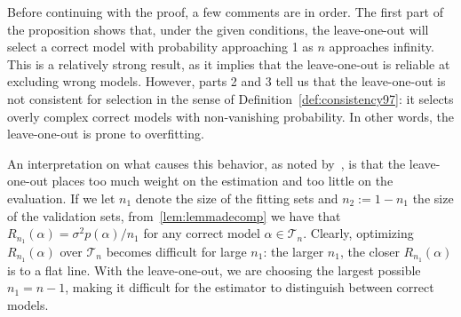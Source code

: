 \documentclass[11pt, letter paper]{article}
\newcommand{\1}{\mathmybb{1}}
\newcommand{\0}{\emptyset}
\newcommand{\Tcal}{\mathcal{T}_{n}}
\begin{document}
Before continuing with the proof, a few comments are in order. The first part of the proposition shows that, under the given conditions, the leave-one-out will select a correct model with probability approaching 1 as \(n\) approaches infinity. This is a relatively strong result, as it implies that the leave-one-out is reliable at excluding wrong models. However, parts 2 and 3 tell us that the leave-one-out is not consistent for selection in the sense of Definition~\ref{def:consistency97}: it selects overly complex correct models with non-vanishing probability. In other words, the leave-one-out is prone to overfitting.

An interpretation on what causes this behavior, as noted by~\textcite{shao_1993}, is that the leave-one-out places too much weight on the estimation and too little on the evaluation. If we let \(n_{1}\) denote the size of the fitting sets and \(n_{2}:=1-n_{1}\) the size of the validation sets, from~\ref{lem:lemmadecomp} we have that \(R_{n_{1}}(\alpha) = \sigma^{2}p(\alpha)/n_{1}\) for any correct model \(\alpha\in\Tcal\). Clearly, optimizing \(R_{n_{1}}(\alpha)\) over \(\Tcal\) becomes difficult for large \(n_{1}\): the larger \(n_{1}\), the closer \(R_{n_{1}}(\alpha)\) is to a flat line. With the leave-one-out, we are choosing the largest possible \(n_{1}= n-1\), making it difficult for the estimator to distinguish between correct models.
\end{document}
